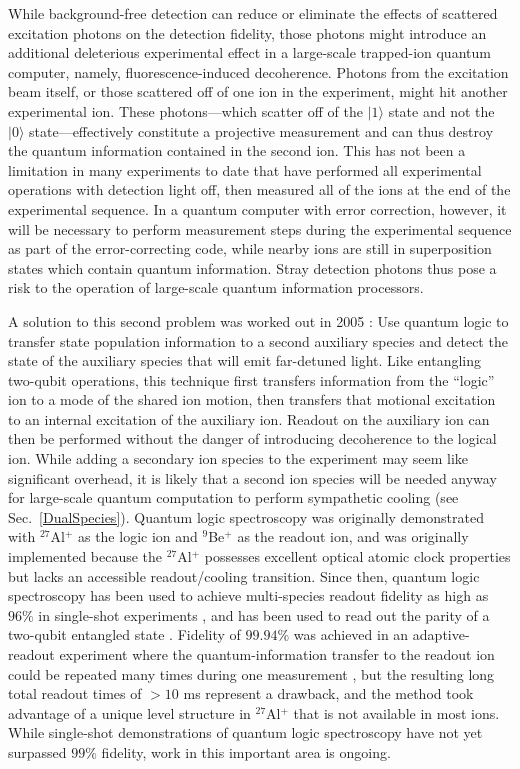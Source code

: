\documentclass[%
12pt,
 amsmath,amssymb,
]{revtex4-2}
\newcommand{\zero}{|0 \rangle}
\newcommand{\one}{|1 \rangle}
\begin{document}
While background-free detection can reduce or eliminate the effects of scattered excitation photons on the detection fidelity, those photons might introduce an additional deleterious experimental effect in a large-scale trapped-ion quantum computer, namely, fluorescence-induced decoherence. Photons from the excitation beam itself, or those scattered off of one ion in the experiment, might hit another experimental ion. These photons---which scatter off of the $\one$ state and not the $\zero$ state---effectively constitute a projective measurement and can thus destroy the quantum information contained in the second ion. This has not been a limitation in many experiments to date that have performed all experimental operations with detection light off, then measured all of the ions at the end of the experimental sequence. In a quantum computer with error correction, however, it will be necessary to perform measurement steps during the experimental sequence as part of the error-correcting code, while nearby ions are still in superposition states which contain quantum information. Stray detection photons thus pose a risk to the operation of large-scale quantum information processors.

A solution to this second problem was worked out in 2005 \cite{SchmidtQuantumLogicSpectroscopy}: Use quantum logic to transfer state population information to a second auxiliary species and detect the state of the auxiliary species that will emit far-detuned light. Like entangling two-qubit operations, this technique first transfers information from the ``logic'' ion to a mode of the shared ion motion, then transfers that motional excitation to an internal excitation of the auxiliary ion. Readout on the auxiliary ion can then be performed without the danger of introducing decoherence to the logical ion. While adding a secondary ion species to the experiment may seem like significant overhead, it is likely that a second ion species will be needed anyway for large-scale quantum computation to perform sympathetic cooling (see Sec.~\ref{DualSpecies}). Quantum logic spectroscopy was originally demonstrated with $^{27}$Al$^+$ as the logic ion and $^9$Be$^+$ as the readout ion, and was originally implemented because the $^{27}$Al$^+$ possesses excellent optical atomic clock properties but lacks an accessible readout/cooling transition. Since then, quantum logic spectroscopy has been used to achieve multi-species readout fidelity as high as $96 \%$ in single-shot experiments \cite{BruzewiczQLAR2017}, and has been used to read out the parity of a two-qubit entangled state \cite{NegnevitskyMultiReadout2018}. Fidelity of $99.94 \%$ was achieved in an adaptive-readout experiment where the quantum-information transfer to the readout ion could be repeated many times during one measurement \cite{HumeAdaptiveDetection2007}, but the resulting long total readout times of $> 10$ ms represent a drawback, and the method took advantage of a unique level structure in $^{27}$Al$^+$ that is not available in most ions. While single-shot demonstrations of quantum logic spectroscopy have not yet surpassed $99\%$ fidelity, work in this important area is ongoing.
\end{document}
